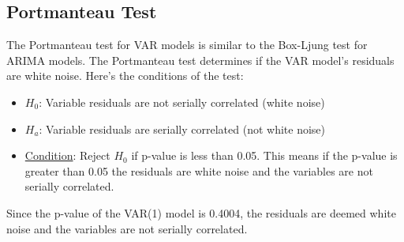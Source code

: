 \documentclass[a4paper]{article}
\begin{document}
\subsection{Portmanteau Test}
The Portmanteau test for VAR models is similar to the Box-Ljung test for ARIMA models. The Portmanteau test determines if the VAR model's residuals are white noise. Here's the conditions of the test:

\begin{itemize}
    \item \underline{$H_0$}: Variable residuals are not serially correlated (white noise)
    \item \underline{$H_a$}: Variable residuals are serially correlated (not white noise)
    \item \underline{Condition}: Reject $H_0$ if p-value is less than 0.05. This means if the p-value is greater than 0.05 the residuals are white noise and the variables are not serially correlated.
\end{itemize}

Since the p-value of the VAR(1) model is 0.4004, the residuals are deemed white noise and the variables are not serially correlated.
\end{document}
